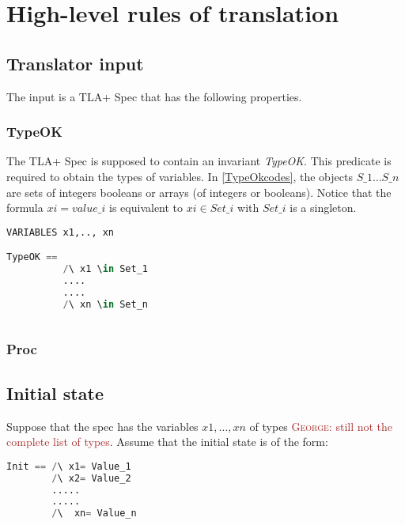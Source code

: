 \documentclass{article}
\theoremstyle{plain}
\numberwithin{equation}{section}
\newcommand{\george}[1]{\textcolor{brown}{\textsc{George: } {\sf #1}}}
\begin{document}
\large

\section{High-level rules of translation }
  
\subsection{Translator input}
The input is a TLA+ Spec that has the following properties. 

\subsubsection{TypeOK} The TLA+ Spec is supposed to contain an invariant \emph{TypeOK}.  This predicate is required to obtain the types of variables. In \eqref{TypeOkcodes}, the objects $S\_1 \dots S\_n$ are sets of integers booleans or arrays (of integers or booleans). Notice that the formula $xi=value\_i$ is equivalent to $xi \in Set\_i$ with $Set\_i$ is a singleton. 


\begin{lstlisting}[language=Python,caption={The explicit form of the predicate \emph{TypeOK}.}, label={TypeOkcodes}] 
VARIABLES x1,.., xn

TypeOK == 
          /\ x1 \in Set_1
          ....
          ....
          /\ xn \in Set_n
 
\end{lstlisting}

\subsubsection{Proc}

\subsection{Initial state} 
Suppose that the spec has the variables $x1, \dots, xn$ of types \george{still not the complete list of types}.  
Assume that the initial state is of the form: 

\begin{lstlisting}[language=Python]
Init == /\ x1= Value_1  
        /\ x2= Value_2  
        .....
        .....
        /\  xn= Value_n   
\end{lstlisting}
\end{document}

